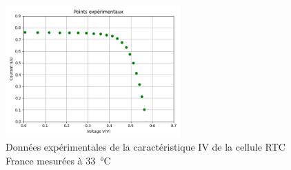 \begin{figure}
  \begin{center}
    \includegraphics[width=0.6\textwidth]{resources/RTCFrance/exp.png}
    \caption{Données expérimentales de la caractéristique IV de la cellule RTC France mesurées à \SI{33}{\celsius}}
    \label{fig:RTCexp}
  \end{center}
\end{figure}

